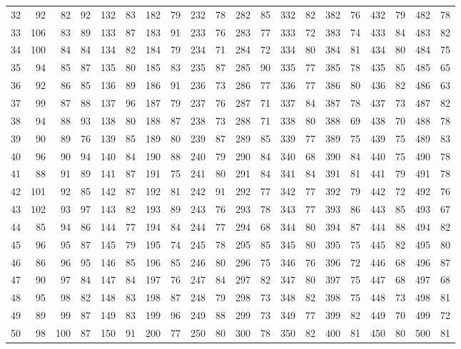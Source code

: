 \begin{tabular}{@{}rr|rr|rr|rr|rr|rr|rr|rr|rr|rr@{}}
32 & 92 & 82 & 92 & 132 & 83 & 182 & 79 & 232 & 78 & 282 & 85 & 332 & 82 & 382 & 76 & 432 & 79 & 482 & 78 \\
33 & 106 & 83 & 89 & 133 & 87 & 183 & 91 & 233 & 76 & 283 & 77 & 333 & 72 & 383 & 74 & 433 & 84 & 483 & 82 \\
34 & 100 & 84 & 84 & 134 & 82 & 184 & 79 & 234 & 71 & 284 & 72 & 334 & 80 & 384 & 81 & 434 & 80 & 484 & 75 \\
35 & 94 & 85 & 87 & 135 & 80 & 185 & 83 & 235 & 87 & 285 & 90 & 335 & 77 & 385 & 78 & 435 & 85 & 485 & 65 \\
36 & 92 & 86 & 85 & 136 & 89 & 186 & 91 & 236 & 73 & 286 & 77 & 336 & 77 & 386 & 80 & 436 & 82 & 486 & 63 \\
37 & 99 & 87 & 88 & 137 & 96 & 187 & 79 & 237 & 76 & 287 & 71 & 337 & 84 & 387 & 78 & 437 & 73 & 487 & 82 \\
38 & 94 & 88 & 93 & 138 & 80 & 188 & 87 & 238 & 73 & 288 & 71 & 338 & 80 & 388 & 69 & 438 & 70 & 488 & 78 \\
39 & 90 & 89 & 76 & 139 & 85 & 189 & 80 & 239 & 87 & 289 & 85 & 339 & 77 & 389 & 75 & 439 & 75 & 489 & 83 \\
40 & 96 & 90 & 94 & 140 & 84 & 190 & 88 & 240 & 79 & 290 & 84 & 340 & 68 & 390 & 84 & 440 & 75 & 490 & 78 \\[1pt]
41 & 88 & 91 & 89 & 141 & 87 & 191 & 75 & 241 & 80 & 291 & 84 & 341 & 84 & 391 & 81 & 441 & 79 & 491 & 78 \\
42 & 101 & 92 & 85 & 142 & 87 & 192 & 81 & 242 & 91 & 292 & 77 & 342 & 77 & 392 & 79 & 442 & 72 & 492 & 76 \\
43 & 102 & 93 & 97 & 143 & 82 & 193 & 89 & 243 & 76 & 293 & 78 & 343 & 77 & 393 & 86 & 443 & 85 & 493 & 67 \\
44 & 85 & 94 & 86 & 144 & 77 & 194 & 84 & 244 & 77 & 294 & 68 & 344 & 80 & 394 & 87 & 444 & 88 & 494 & 82 \\
45 & 96 & 95 & 87 & 145 & 79 & 195 & 74 & 245 & 78 & 295 & 85 & 345 & 80 & 395 & 75 & 445 & 82 & 495 & 80 \\
46 & 86 & 96 & 95 & 146 & 85 & 196 & 85 & 246 & 80 & 296 & 75 & 346 & 76 & 396 & 72 & 446 & 68 & 496 & 87 \\
47 & 90 & 97 & 84 & 147 & 84 & 197 & 76 & 247 & 84 & 297 & 82 & 347 & 80 & 397 & 75 & 447 & 68 & 497 & 68 \\
48 & 95 & 98 & 82 & 148 & 83 & 198 & 87 & 248 & 79 & 298 & 73 & 348 & 82 & 398 & 75 & 448 & 73 & 498 & 81 \\
49 & 89 & 99 & 87 & 149 & 83 & 199 & 96 & 249 & 88 & 299 & 73 & 349 & 77 & 399 & 82 & 449 & 70 & 499 & 72 \\
50 & 98 & 100 & 87 & 150 & 91 & 200 & 77 & 250 & 80 & 300 & 78 & 350 & 82 & 400 & 81 & 450 & 80 & 500 & 81 \\
\hline\end{tabular}\par\endgroup


